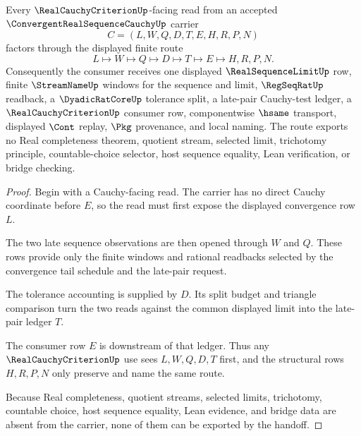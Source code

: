 \begin{theorem}\label{thm:convergent-real-sequence-cauchy-criterion-handoff}
Every $\RealCauchyCriterionUp$-facing read from an accepted $\ConvergentRealSequenceCauchyUp$ carrier
$$
C=(L,W,Q,D,T,E,H,R,P,N)
$$
factors through the displayed finite route
$$
L \longmapsto W \longmapsto Q \longmapsto D \longmapsto T \longmapsto E \longmapsto H,R,P,N .
$$
Consequently the consumer receives one displayed $\RealSequenceLimitUp$ row, finite $\StreamNameUp$ windows for the sequence and limit, $\RegSeqRatUp$ readback, a $\DyadicRatCoreUp$ tolerance split, a late-pair Cauchy-test ledger, a $\RealCauchyCriterionUp$ consumer row, componentwise $\hsame$ transport, displayed $\Cont$ replay, $\Pkg$ provenance, and local naming. The route exports no Real completeness theorem, quotient stream, selected limit, trichotomy principle, countable-choice selector, host sequence equality, Lean verification, or bridge checking.
\end{theorem}
\begin{proof}
Begin with a Cauchy-facing read. The carrier has no direct Cauchy coordinate before $E$, so the read must first expose the displayed convergence row $L$.

The two late sequence observations are then opened through $W$ and $Q$. These rows provide only the finite windows and rational readbacks selected by the convergence tail schedule and the late-pair request.

The tolerance accounting is supplied by $D$. Its split budget and triangle comparison turn the two reads against the common displayed limit into the late-pair ledger $T$.

The consumer row $E$ is downstream of that ledger. Thus any $\RealCauchyCriterionUp$ use sees $L,W,Q,D,T$ first, and the structural rows $H,R,P,N$ only preserve and name the same route.

Because Real completeness, quotient streams, selected limits, trichotomy, countable choice, host sequence equality, Lean evidence, and bridge data are absent from the carrier, none of them can be exported by the handoff.
\end{proof}

